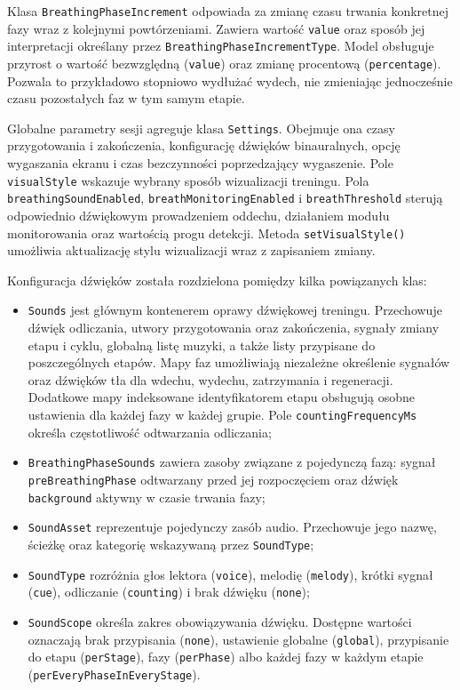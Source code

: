 Klasa \texttt{BreathingPhaseIncrement} odpowiada za zmianę czasu trwania konkretnej fazy wraz z kolejnymi powtórzeniami. Zawiera wartość \texttt{value} oraz sposób jej interpretacji określany przez \texttt{BreathingPhaseIncrementType}. Model obsługuje przyrost o wartość bezwzględną (\texttt{value}) oraz zmianę procentową (\texttt{percentage}). Pozwala to przykładowo stopniowo wydłużać wydech, nie zmieniając jednocześnie czasu pozostałych faz w tym samym etapie.

Globalne parametry sesji agreguje klasa \texttt{Settings}. Obejmuje ona czasy przygotowania i zakończenia, konfigurację dźwięków binauralnych, opcję wygaszania ekranu i czas bezczynności poprzedzający wygaszenie. Pole \texttt{visualStyle} wskazuje wybrany sposób wizualizacji treningu. Pola \texttt{breathingSoundEnabled}, \texttt{breathMonitoringEnabled} i \texttt{breathThreshold} sterują odpowiednio dźwiękowym prowadzeniem oddechu, działaniem modułu monitorowania oraz wartością progu detekcji. Metoda \texttt{setVisualStyle()} umożliwia aktualizację stylu wizualizacji wraz z zapisaniem zmiany.

Konfiguracja dźwięków została rozdzielona pomiędzy kilka powiązanych klas:

\begin{itemize}
    \item \texttt{Sounds} jest głównym kontenerem oprawy dźwiękowej treningu. Przechowuje dźwięk odliczania, utwory przygotowania oraz zakończenia, sygnały zmiany etapu i cyklu, globalną listę muzyki, a także listy przypisane do poszczególnych etapów. Mapy faz umożliwiają niezależne określenie sygnałów oraz dźwięków tła dla wdechu, wydechu, zatrzymania i regeneracji. Dodatkowe mapy indeksowane identyfikatorem etapu obsługują osobne ustawienia dla każdej fazy w każdej grupie. Pole \texttt{countingFrequencyMs} określa częstotliwość odtwarzania odliczania;
    \item \texttt{BreathingPhaseSounds} zawiera zasoby związane z pojedynczą fazą: sygnał \texttt{preBreathingPhase} odtwarzany przed jej rozpoczęciem oraz dźwięk \texttt{background} aktywny w czasie trwania fazy;
    \item \texttt{SoundAsset} reprezentuje pojedynczy zasób audio. Przechowuje jego nazwę, ścieżkę oraz kategorię wskazywaną przez \texttt{SoundType};
    \item \texttt{SoundType} rozróżnia głos lektora (\texttt{voice}), melodię (\texttt{melody}), krótki sygnał (\texttt{cue}), odliczanie (\texttt{counting}) i brak dźwięku (\texttt{none});
    \item \texttt{SoundScope} określa zakres obowiązywania dźwięku. Dostępne wartości oznaczają brak przypisania (\texttt{none}), ustawienie globalne (\texttt{global}), przypisanie do etapu (\texttt{perStage}), fazy (\texttt{perPhase}) albo każdej fazy w każdym etapie (\texttt{perEveryPhaseInEveryStage}).
\end{itemize}

